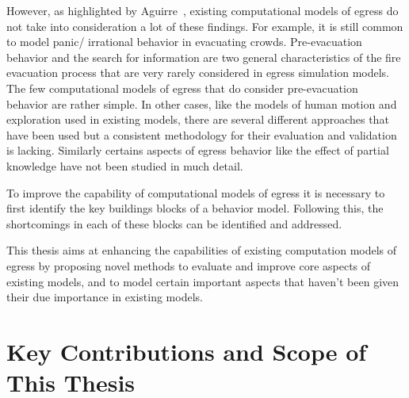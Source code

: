 However, as highlighted by Aguirre~\cite{Aguirre:2004tn}, existing computational models of egress do not take into consideration a lot of these findings. For example, it is still common to model panic/ irrational behavior in evacuating crowds.
 Pre-evacuation behavior and the search for information are two general characteristics of the fire evacuation process that are very rarely considered in egress simulation models. The few computational models of egress that do consider pre-evacuation~\cite{Pires:2005gs,Klupfel:2003wa} behavior are rather simple. In other cases, like the models of human motion and exploration used in existing models, there are several different approaches that have been used but a consistent methodology for their evaluation and validation is lacking. Similarly certains aspects of egress behavior like the effect of partial knowledge have not been studied in much detail.

 To improve the capability of computational models of egress it is necessary to first identify the key buildings blocks of a behavior model. Following this, the shortcomings in each of these blocks can be identified and addressed.


This thesis aims at enhancing the capabilities of existing computation models of egress by proposing novel methods to evaluate and improve core aspects of existing models, and to model certain important aspects that haven't been given their due importance in existing models.


\section{Key Contributions and Scope of This Thesis}
\label{Intro:Contributions}

